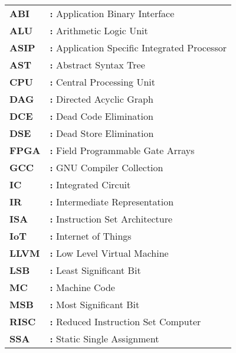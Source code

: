 \begin{tabular}{@{}p{2cm}l}
{\bf{ABI}} & {\bf:} Application Binary Interface\\
{\bf ALU} & {\bf:} Arithmetic Logic Unit\\
{\bf ASIP} & {\bf:} Application Specific Integrated Processor\\
{\bf AST} & {\bf:} Abstract Syntax Tree\\
{\bf CPU} & {\bf:} Central Processing Unit\\
{\bf DAG} & {\bf:} Directed Acyclic Graph\\
{\bf DCE} & {\bf:} Dead Code Elimination\\
{\bf DSE} & {\bf:} Dead Store Elimination\\
{\bf FPGA} & {\bf:} Field Programmable Gate Arrays\\
{\bf GCC} & {\bf:} GNU Compiler Collection\\
{\bf IC} & {\bf:} Integrated Circuit\\
{\bf IR} & {\bf:} Intermediate Representation\\
{\bf ISA} & {\bf:} Instruction Set Architecture\\
{\bf IoT} & {\bf:} Internet of Things\\
{\bf LLVM} & {\bf:} Low Level Virtual Machine\\
{\bf LSB} & {\bf:} Least Significant Bit\\
{\bf MC} & {\bf:} Machine Code\\
{\bf MSB} & {\bf:} Most Significant Bit\\
{\bf RISC} & {\bf:} Reduced Instruction Set Computer\\
{\bf SSA} & {\bf:} Static Single Assignment\\
\end{tabular}

